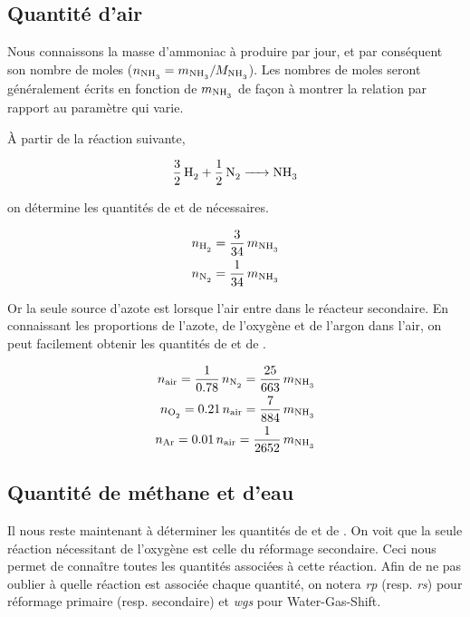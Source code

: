 \documentclass[a4paper, oneside, 12pt]{article}
\begin{document}
\subsection{Quantité d'air}

Nous connaissons la masse d'ammoniac à produire par jour, 
et par conséquent son nombre de moles ($n_{\ce{NH3}} = m_{\ce{NH3}}/M_{\ce{NH3}}$).
Les nombres de moles seront généralement écrits en fonction de $m_{\ce{NH3}}$ 
de façon à montrer la relation par rapport au paramètre qui varie.

À partir de la réaction suivante,

\begin{equation*}
	\ce{\frac{3}{2} \, H2 + \frac{1}{2} \, N2 -> NH3} 
\end{equation*}

on détermine les quantités de  et de  nécessaires.

\begin{align}
	n_{\ce{H2}} = \frac{3}{34} \, m_{\ce{NH3}} 
	\label{eq:moles_H2} \\
	n_{\ce{N2}} = \frac{1}{34} \, m_{\ce{NH3}} \nonumber
\end{align}

Or la seule source d'azote est lorsque l'air entre dans le réacteur secondaire.
En connaissant les proportions de l'azote, de l'oxygène et de l'argon dans 
l'air, on peut facilement obtenir les quantités de  et de .

\begin{align*}
	n_{\text{air}} = \frac{1}{0.78} \, n_{\ce{N2}} = \frac{25}{663} \, m_{\ce{NH3}} \\
	n_{\ce{O2}} = 0.21 \, n_{\text{air}} = \frac{7}{884} \, m_{\ce{NH3}} \\
	n_{\ce{Ar}} = 0.01 \, n_{\text{air}} = \frac{1}{2652} \, m_{\ce{NH3}} 
\end{align*}

\subsection{Quantité de méthane et d'eau}

Il nous reste maintenant à déterminer les quantités de  et de .
On voit que la seule réaction nécessitant de l'oxygène est celle du 
réformage secondaire. Ceci nous permet de conna\^itre toutes les quantités 
associées à cette réaction. 
Afin de ne pas oublier à quelle réaction est associée chaque quantité, 
on notera \textit{rp} (resp. \textit{rs}) pour réformage primaire (resp. secondaire)
et \textit{wgs} pour Water-Gas-Shift.
\end{document}
